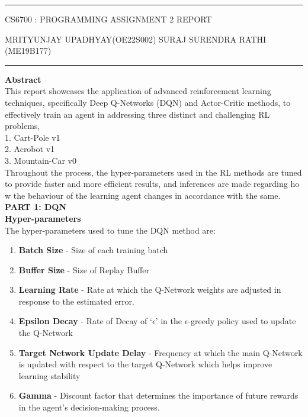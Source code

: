 \documentclass{article}
\begin{document}
    \hrule
    \vspace{1mm}
    \noindent
    \begin{center}
    {\Large CS6700 : PROGRAMMING ASSIGNMENT 2 REPORT }
    \end{center}
    \vspace{1mm}
    \noindent

    \noindent MRITYUNJAY UPADHYAY(OE22S002) \hfill SURAJ SURENDRA RATHI (ME19B177)
    \vspace{2mm}
    \hrule
    \vspace{4mm}
    \textbf{\Large{Abstract}}\\

    This report showcases the application of advanced reinforcement learning techniques, specifically Deep Q-Networks (DQN) and Actor-Critic methods, to effectively train an agent in addressing three distinct and challenging RL problems,\\
    1. Cart-Pole v1 \\
    2. Acrobot v1  \\
    3. Mountain-Car v0 \\
    Throughout the process, the hyper-parameters used in the RL methods
    are tuned to provide faster and more efficient results, and inferences are
    made regarding ho w the behaviour of the learning agent changes in accordance with the same.\\
    \newline
    \textbf{\huge{PART 1: DQN}}\\

    \textbf{\Large{Hyper-parameters}}\\

    The hyper-parameters used to tune the DQN method are:
    \begin{enumerate}[label=\arabic*.]
        \item \textbf{Batch Size} - Size of each training batch
        \item \textbf{Buffer Size} - Size of Replay Buffer
        \item \textbf{Learning Rate} - Rate at which the Q-Network weights are adjusted in response to the estimated error.
        \item \textbf{Epsilon Decay} - Rate of Decay of `$\epsilon$' in the $\epsilon$-greedy policy used to update the Q-Network
        \item \textbf{Target Network Update Delay} - Frequency at which the main Q-Network is updated with respect to the target Q-Network which helps improve learning stability
        \item \textbf{Gamma} - Discount factor that determines the importance of future rewards in the agent's decision-making process.
    \end{enumerate}
\end{document}
